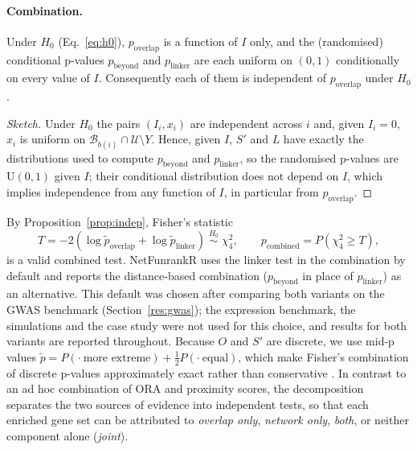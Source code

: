 \paragraph{Combination.}
\begin{proposition}\label{prop:indep}
Under $H_0$ (Eq.~\ref{eq:h0}), $p_{\mathrm{overlap}}$ is a function of $I$ only, and the (randomised) conditional p-values $p_{\mathrm{beyond}}$ and $p_{\mathrm{linker}}$ are each uniform on $(0,1)$ conditionally on every value of $I$. Consequently each of them is independent of $p_{\mathrm{overlap}}$ under $H_0$.
\end{proposition}
\begin{proof}[Sketch]
Under $H_0$ the pairs $(I_i, x_i)$ are independent across $i$ and, given $I_i = 0$, $x_i$ is uniform on $\mathcal{B}_{b(i)} \cap \mathcal{U} \setminus Y$. Hence, given $I$, $S'$ and $L$ have exactly the distributions used to compute $p_{\mathrm{beyond}}$ and $p_{\mathrm{linker}}$, so the randomised p-values are $\mathrm{U}(0,1)$ given $I$; their conditional distribution does not depend on $I$, which implies independence from any function of $I$, in particular from $p_{\mathrm{overlap}}$.
\end{proof}
By Proposition~\ref{prop:indep}, Fisher's statistic
\begin{equation}
T = -2\left(\log \tilde p_{\mathrm{overlap}} + \log \tilde p_{\mathrm{linker}}\right) \;\overset{H_0}{\sim}\; \chi^2_4,
\qquad p_{\mathrm{combined}} = P(\chi^2_4 \ge T),
\label{eq:fisher}
\end{equation}
is a valid combined test. NetFunrankR uses the linker test in the combination by default and reports the distance-based combination ($p_{\mathrm{beyond}}$ in place of $p_{\mathrm{linker}}$) as an alternative. This default was chosen after comparing both variants on the GWAS benchmark (Section~\ref{res:gwas}); the expression benchmark, the simulations and the case study were not used for this choice, and results for both variants are reported throughout. Because $O$ and $S'$ are discrete, we use mid-p values $\tilde p = P(\cdot\ \text{more extreme}) + \tfrac12 P(\cdot\ \text{equal})$, which make Fisher's combination of discrete p-values approximately exact rather than conservative \citep{Lancaster1961,Hwang2001}. In contrast to an ad hoc combination of ORA and proximity scores, the decomposition separates the two sources of evidence into independent tests, so that each enriched gene set can be attributed to \emph{overlap only}, \emph{network only}, \emph{both}, or neither component alone (\emph{joint}).

